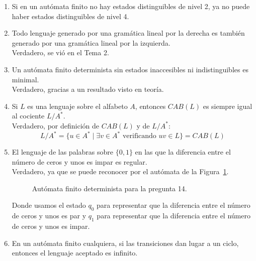 \begin{enumerate}
    \item Si en un autómata finito no hay estados distinguibles de nivel 2, ya no puede haber estados distinguibles de nivel 4.\\

    \item Todo lenguaje generado por una gramática lineal por la derecha es también generado por una gramática lineal por la izquierda.\\
        
        Verdadero, se vió en el Tema 2.
    \item Un autómata finito determinista sin estados inaccesibles ni indistinguibles es minimal.\\

        Verdadero, gracias a un resultado visto en teoría.
    \item Si $L$ es una lenguaje sobre el alfabeto $A$, entonces $CAB(L)$ es siempre igual al cociente $L/A^\ast$.\\

        Verdadero, por definición de $CAB(L)$ y de $L/A^\ast$:
        \begin{equation*}
            L/A^\ast = \{u\in A^\ast \mid \exists v\in A^\ast \text{\ verificando\ } uv \in L\} = CAB(L)
        \end{equation*}
    \item El lenguaje de las palabras sobre $\{0,1\}$ en las que la diferencia entre el número de ceros y unos es impar es regular.\\

        Verdadero, ya que se puede reconocer por el autómata de la Figura~\ref{fig:tipo_test14}.
        \begin{figure}[H]
           \centering
           \caption{Autómata finito determinista para la pregunta 14.}
           \label{fig:tipo_test14}
       \end{figure}
       Donde usamos el estado $q_0$ para representar que la diferencia entre el número de ceros y unos es par y $q_1$ para representar que la diferencia entre el número de ceros y unos es impar.
    \item En un autómata finito cualquiera, si las transiciones dan lugar a un ciclo, entonces el lenguaje aceptado es infinito.\\


\end{enumerate}
